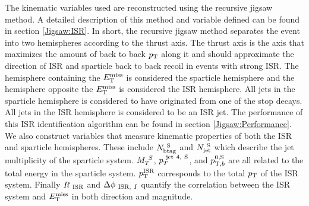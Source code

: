 
\indent The kinematic variables used are reconstructed using the recursive jigsaw method.  A detailed description of this method and variable defined can be found in section \ref{Jigsaw:ISR}.  In short, the recursive jigsaw method separates the event into two hemispheres according to the thrust axis.  The thrust axis is the axis that maximizes the amount of back to back $p_{\mathrm{T}}$ along it and should approximate the direction of ISR and sparticle back to back recoil in events with strong ISR.  The hemisphere containing the $E_{\mathrm{T}}^{\mathrm{miss}}$ is considered the sparticle hemisphere and the hemisphere opposite the $E_{\mathrm{T}}^{\mathrm{miss}}$ is considered the ISR hemisphere.  All jets in the sparticle hemisphere is considered to have originated from one of the stop decays.  All jets in the ISR hemisphere is considered to be an ISR jet.  The performance of this ISR identification algorithm can be found in section \ref{Jigsaw:Performance}. \\

\indent We also construct variables that measure kinematic properties of both the ISR and sparticle hemispheres.  These include $N_{\mathrm{btag}}^{~\mathrm{S}}$ and $N_{\mathrm{jet}}^{~\mathrm{S}}$ which describe the jet multiplicity of the sparticle system.  $M_{T}^{~S}$, $p_{T}^{~\mathrm{jet~4,~S}}$, and $p_{\mathrm{T},b}^{0,\mathrm{S}}$ are all related to the total energy in the sparticle system.  $p_{\mathrm{T}}^{\mathrm{ISR}}$ corresponds to the total $p_{\mathrm{T}}$ of the ISR system.  Finally $R_{~\mathrm{ISR}}$ and $\Delta\phi_{~\mathrm{ISR},~I}$ quantify the correlation between the ISR system and $E_{\mathrm{T}}^{\mathrm{miss}}$ in both direction and magnitude. \\


